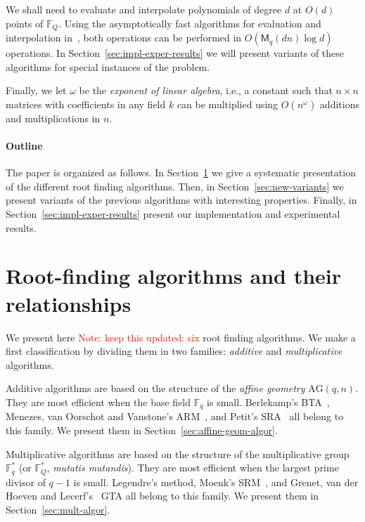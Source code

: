 \documentclass{article}
\newcommand{\ff}[1]{\mathbb{F}_{#1}}
\newcommand{\qq}{q}
\newcommand{\nn}{n}
\newcommand{\AG}{\mathrm{AG}(\qq,\nn)}
\newcommand{\Mul}{\mathsf{M}}
\newcounter{algo}
\newcommand{\Notes}[1]{\textcolor{red}{Note: #1}}
\begin{document}
We shall need to evaluate and interpolate polynomials of degree $d$ at
$O(d)$ points of $\ff{Q}$. Using the asymptotically fast algorithms
for evaluation and interpolation in~\cite[Chapter~10]{Gathen2003},
both operations can be performed in $O(\Mul_q(dn)\log d)$
operations.  In Section~\ref{sec:impl-exper-results} we will present
variants of these algorithms for special instances of the problem.

Finally, we let $ω$ be the \emph{exponent of linear algebra}, i.e., a
constant such that $n\times n$ matrices with coefficients in any field
$k$ can be multiplied using $O(n^\omega)$ additions and
multiplications in $n$.


\paragraph{Outline}
The paper is organized as follows. In
Section~\ref{sec:root-find-algor} we give a systematic presentation of
the different root finding algorithms. Then, in
Section~\ref{sec:new-variants} we present variants of the previous
algorithms with interesting properties. Finally, in
Section~\ref{sec:impl-exper-results} present our implementation and
experimental results.




\section{Root-finding algorithms and their relationships}
\label{sec:root-find-algor}

We present here \Notes{keep this updated: six} root finding
algorithms. We make a first classification by dividing them in two
families: \emph{additive} and \emph{multiplicative} algorithms.

Additive algorithms are based on the structure of the \emph{affine
  geometry} $\AG$. They are most efficient when the base field
$\ff{q}$ is small.  Berlekamp's BTA~\cite{berl70}, Menezes, van
Oorschot and Vanstone's ARM~\cite{Menvanovans92}, and Petit's
SRA~\cite{cgUCL-P14} all belong to this family.  We present them in
Section~\ref{sec:affine-geom-algor}.

Multiplicative algorithms are based on the structure of the multiplicative
group $\ff{q}^\ast$ (or $\ff{Q}^\ast$, \emph{mutatis mutandis}). They
are most efficient when the largest prime divisor of $q-1$ is
small. Legendre's method, Moenk's SRM~\cite{Moenck77}, and Grenet, van
der Hoeven and Lecerf's~\cite{grenet2015deterministic} GTA all belong
to this family. We present them in Section~\ref{sec:mult-algor}.
\end{document}
